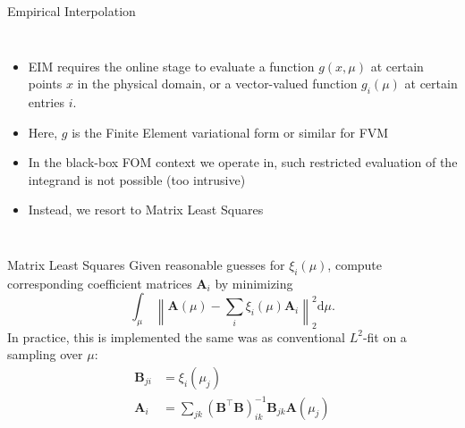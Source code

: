 \documentclass{sintefbeamer}
\begin{document}
\begin{frame}{Empirical Interpolation}
    \begin{columns}
        \begin{itemize}
            \item EIM requires the online stage to evaluate a function \(g(x,\mu)\) at certain points \(x\) in the physical domain, or a vector-valued function \(g_i(\mu)\) at certain entries \(i\).
            \item Here, \(g\) is the Finite Element variational form or similar for FVM
            \item In the black-box FOM context we operate in, such restricted evaluation of the integrand is not possible (too intrusive)
            \item Instead, we resort to Matrix Least Squares
        \end{itemize}
    \end{columns}
\end{frame}

\begin{frame}{Matrix Least Squares}
    Given reasonable guesses for \(\xi_i(\mu)\), compute corresponding coefficient matrices \(\mathbf A_i\) by minimizing
    \[
        \int_\mu \, \left\| \mathbf A(\mu) - \sum_i \xi_i(\mu) \mathbf A_i \right\|^2_2 \mathup{d}\mu.
    \]
    In practice, this is implemented the same was as conventional \(L^2\)-fit on a sampling over \(\mu\):
    \begin{align*}
        \mathbf B_{ji} &= \xi_i(\mu_j) \\
        \mathbf A_i &= \sum_{jk} (\mathbf B^\intercal \mathbf B)_{ik}^{-1} \mathbf B_{jk} \mathbf A(\mu_j)
    \end{align*}
\end{frame}
\end{document}
